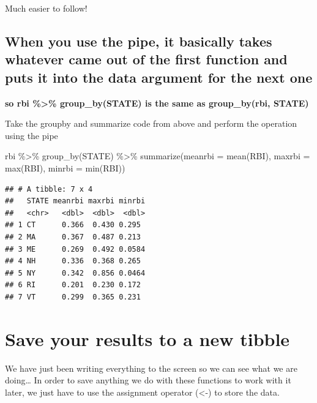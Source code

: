 \documentclass[
]{book}
\newenvironment{Shaded}{\begin{snugshade}}{\end{snugshade}}
\newcommand{\AttributeTok}[1]{\textcolor[rgb]{0.77,0.63,0.00}{#1}}
\newcommand{\FunctionTok}[1]{\textcolor[rgb]{0.00,0.00,0.00}{#1}}
\newcommand{\NormalTok}[1]{#1}
\newcommand{\SpecialCharTok}[1]{\textcolor[rgb]{0.00,0.00,0.00}{#1}}
\begin{document}
Much easier to follow!

\hypertarget{when-you-use-the-pipe-it-basically-takes-whatever-came-out-of-the-first-function-and-puts-it-into-the-data-argument-for-the-next-one}{%
\subsection{When you use the pipe, it basically takes whatever came out of the first function and puts it into the data argument for the next one}\label{when-you-use-the-pipe-it-basically-takes-whatever-came-out-of-the-first-function-and-puts-it-into-the-data-argument-for-the-next-one}}

\textbf{so rbi \%\textgreater\% group\_by(STATE) is the same as group\_by(rbi, STATE)}

Take the groupby and summarize code from above and perform the operation using the pipe

\begin{Shaded}
\begin{Highlighting}[]
\NormalTok{rbi }\SpecialCharTok{\%\textgreater{}\%}
  \FunctionTok{group\_by}\NormalTok{(STATE) }\SpecialCharTok{\%\textgreater{}\%}
  \FunctionTok{summarize}\NormalTok{(}\AttributeTok{meanrbi =} \FunctionTok{mean}\NormalTok{(RBI), }\AttributeTok{maxrbi =} \FunctionTok{max}\NormalTok{(RBI), }\AttributeTok{minrbi =} \FunctionTok{min}\NormalTok{(RBI))}
\end{Highlighting}
\end{Shaded}

\begin{verbatim}
## # A tibble: 7 x 4
##   STATE meanrbi maxrbi minrbi
##   <chr>   <dbl>  <dbl>  <dbl>
## 1 CT      0.366  0.430 0.295 
## 2 MA      0.367  0.487 0.213 
## 3 ME      0.269  0.492 0.0584
## 4 NH      0.336  0.368 0.265 
## 5 NY      0.342  0.856 0.0464
## 6 RI      0.201  0.230 0.172 
## 7 VT      0.299  0.365 0.231
\end{verbatim}

\hypertarget{save-your-results-to-a-new-tibble}{%
\section{Save your results to a new tibble}\label{save-your-results-to-a-new-tibble}}

We have just been writing everything to the screen so we can see what we are doing\ldots{} In order to save anything we do with these functions to work with it later, we just have to use the assignment operator (\textless-) to store the data.
\end{document}
